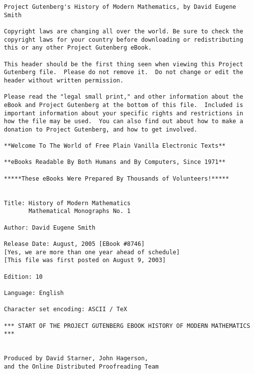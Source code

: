 \documentclass[oneside]{book}
\begin{document}
\thispagestyle{empty}
\small
\begin{verbatim}
Project Gutenberg's History of Modern Mathematics, by David Eugene Smith

Copyright laws are changing all over the world. Be sure to check the
copyright laws for your country before downloading or redistributing
this or any other Project Gutenberg eBook.

This header should be the first thing seen when viewing this Project
Gutenberg file.  Please do not remove it.  Do not change or edit the
header without written permission.

Please read the "legal small print," and other information about the
eBook and Project Gutenberg at the bottom of this file.  Included is
important information about your specific rights and restrictions in
how the file may be used.  You can also find out about how to make a
donation to Project Gutenberg, and how to get involved.

**Welcome To The World of Free Plain Vanilla Electronic Texts**

**eBooks Readable By Both Humans and By Computers, Since 1971**

*****These eBooks Were Prepared By Thousands of Volunteers!*****


Title: History of Modern Mathematics
       Mathematical Monographs No. 1

Author: David Eugene Smith

Release Date: August, 2005 [EBook #8746]
[Yes, we are more than one year ahead of schedule]
[This file was first posted on August 9, 2003]

Edition: 10

Language: English

Character set encoding: ASCII / TeX

*** START OF THE PROJECT GUTENBERG EBOOK HISTORY OF MODERN MATHEMATICS ***


Produced by David Starner, John Hagerson,
and the Online Distributed Proofreading Team

\end{verbatim}

\normalsize
\newpage



\renewcommand{\chaptername}{Article}

\frontmatter
\end{document}
